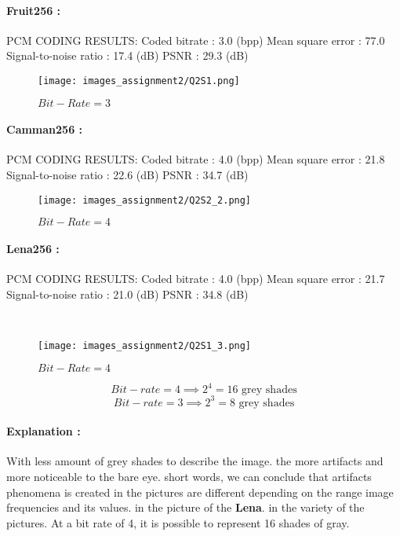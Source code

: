 \documentclass[letterpaper, 12pt]{article}
\begin{document}
\paragraph{Fruit256 : } 
PCM CODING RESULTS:
   Coded bitrate 		: 3.0 (bpp)
   Mean square error		: 77.0 
   Signal-to-noise ratio	: 17.4 (dB)
   PSNR			: 29.3 (dB)
\\
\begin{figure}[htbp]
    \centering
    \texttt{[image: images\_assignment2/Q2S1.png]}
    \caption{$Bit-Rate = 3$}
    \label{fig:enter-label}
    
    
\end{figure}
 \paragraph{Camman256 :} 
 PCM CODING RESULTS:
   Coded bitrate 		: 4.0 (bpp)
   Mean square error		: 21.8 
   Signal-to-noise ratio	: 22.6 (dB)
   PSNR			: 34.7 (dB)
 \\
\begin{figure}[htbp]
    \centering
    \texttt{[image: images\_assignment2/Q2S2\_2.png]}
    \caption{$Bit-Rate = 4$}
    \label{fig:enter-label}
    
    
\end{figure}
 \paragraph{Lena256 : } 
 PCM CODING RESULTS:
   Coded bitrate 		: 4.0 (bpp)
   Mean square error		: 21.7 
   Signal-to-noise ratio	: 21.0 (dB)
   PSNR			: 34.8 (dB)

 \\
\begin{figure}[htbp]
    \centering
    \texttt{[image: images\_assignment2/Q2S1\_3.png]}
    \caption{$Bit-Rate = 4$}
    \label{fig:enter-label}
    
    
\end{figure}
\[Bit-rate = 4 \implies 2^4 = 16 \text{ grey shades}\]
\[Bit-rate = 3 \implies 2^3 = 8 \text{ grey shades}\] 
\paragraph{Explanation :} With less amount of grey shades to describe the image. the more artifacts and more noticeable to the bare eye. short words, we can conclude that artifacts phenomena is created in the pictures are different depending on the range image frequencies and its values. in the picture of the \textbf{Lena}.
in the variety of the pictures. At a bit rate of 4, it is possible to represent 16 shades of gray.
\newpage
\end{document}
